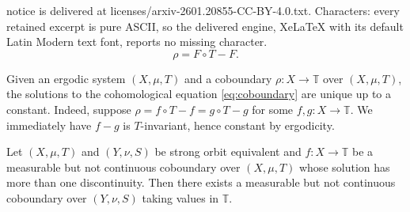 \documentclass[10pt,a4paper]{amsart}
\begin{document}
notice is delivered at licenses/arxiv-2601.20855-CC-BY-4.0.txt. Characters: every retained excerpt is pure ASCII, so the delivered engine, XeLaTeX with its default Latin Modern text font, reports no missing character.
    \begin{equation} \label{eq:coboundary}
        \rho=F \circ T - F.
    \end{equation}

\begin{remark} \label{cob soln are unique}
    Given an ergodic system $(X,\mu,T)$ and a coboundary $\rho\colon X \rightarrow \mathbb{T}$ over $(X,\mu,T)$, the solutions to the cohomological equation \eqref{eq:coboundary} are unique up to a constant. Indeed, suppose $\rho=f\circ T - f=g\circ T- g$ for some $f,g\colon  X \rightarrow \mathbb{T}$. We immediately have $f - g$ is $T$-invariant, hence constant by ergodicity.
\end{remark}

\begin{lemma}\label{measurable but not continuous coboundary over minimal cantor system}
    Let $(X,\mu,T)$ and $(Y,\nu,S)$ be strong orbit equivalent and $f\colon X \rightarrow \mathbb{T}$ be a measurable but not continuous coboundary over $(X,\mu,T)$ whose solution has more than one discontinuity. Then there exists a measurable but not continuous coboundary over $(Y,\nu,S)$ taking values in $\mathbb{T}.$
\end{lemma}
\end{document}
